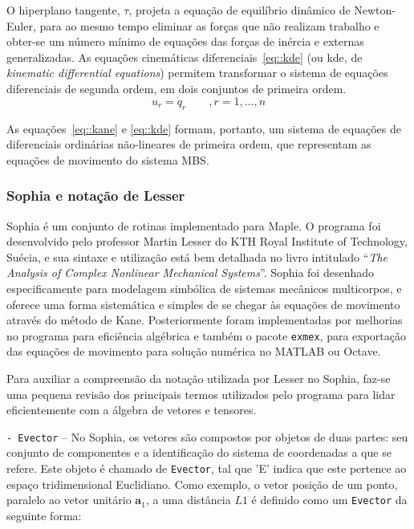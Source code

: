 O hiperplano tangente, $\tau$, projeta a equação de equilíbrio dinâmico de
Newton-Euler, para ao mesmo tempo eliminar as forças que não realizam trabalho e
obter-se um número mínimo de equações das forças de inércia e externas
generalizadas.
As equações cinemáticas diferenciais~\ref{eq::kde} (ou kde, de \textit{kinematic
differential equations}) permitem transformar o sistema de equações diferenciais
de segunda ordem, em dois conjuntos de primeira ordem.
%
\begin{equation} \label{eq::kde}
	u_r = \dot{q}_r \qquad, r = 1,\ldots,n
\end{equation}
%

As equações~\ref{eq::kane} e \ref{eq::kde} formam, portanto, um sistema de
equações de diferenciais ordinárias não-lineares de primeira ordem, que
representam as equações de movimento do sistema MBS.


\subsubsection{Sophia e notação de Lesser} \label{sec::lesser}

Sophia é um conjunto de rotinas implementado para Maple. O programa foi
desenvolvido pelo professor Martin Lesser do KTH Royal Institute of Technology,
Suécia, e sua sintaxe e utilização está bem detalhada no livro intitulado
``\textit{The Analysis of Complex Nonlinear Mechanical
Systems}''\cite{lesser1995analysis}. Sophia foi desenhado especificamente para
modelagem simbólica de sistemas mecânicos multicorpos, e oferece uma forma
sistemática e simples de se chegar às equações de movimento através do método de
Kane. Posteriormente foram implementadas por \citet{lennartsson1999efficient}
melhorias no programa para eficiência algébrica e também o pacote
\texttt{exmex}, para exportação das equações de movimento para solução numérica
no MATLAB ou Octave.

Para auxiliar a compreensão da notação utilizada por Lesser no Sophia, faz-se
uma pequena revisão dos principais termos utilizados pelo programa para lidar
eficientemente com a álgebra de vetores e tensores.

\medskip \noindent
\texttt{- Evector} -- No Sophia, os vetores são compostos por objetos de duas
partes:
seu conjunto de componentes e a identificação do sistema de coordenadas a que se
refere. Este objeto é chamado de \texttt{Evector}, tal que 'E' indica que este
pertence ao espaço tridimensional Euclidiano. Como exemplo, o vetor posição de
um ponto, paralelo ao vetor unitário $\mathbf{a}_1$, a uma distância $L1$ é
definido como um \texttt{Evector} da seguinte forma:

